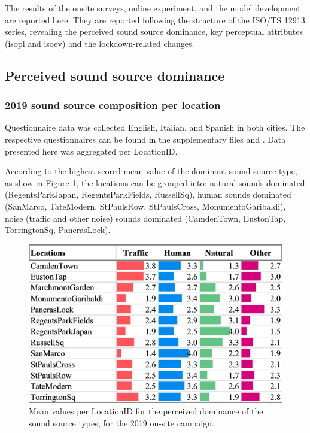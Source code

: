 The results of the onsite surveys, online experiment, and the model development are reported here. They are reported following the structure of the ISO/TS 12913 series, revealing the perceived sound source dominance, key perceptual attributes (\gls{isopl} and \gls{isoev}) and the lockdown-related changes.

 \subsection{Perceived sound source dominance}

   \subsubsection{2019 sound source composition per location}

   Questionnaire data was collected English, Italian, and Spanish in both cities. The respective questionnaires can be found in the supplementary files and \citet{Mitchell2020Soundscape}. Data presented here was aggregated per LocationID.

   According to the highest scored mean value of the dominant sound source type, as show in Figure \ref{fig:sound-source-dom}, the locations can be grouped into: natural sounds dominated (RegentsParkJapan, RegentsParkFields, RussellSq), human sounds dominated (SanMarco, TateModern, StPaulsRow, StPaulsCross, MonumentoGaribaldi), noise (traffic and other noise) sounds dominated (CamdenTown, EustonTap, TorringtonSq, PancrasLock).

   \begin{figure}
     \label{fig:sound-source-dom}
     \centering
     \includegraphics[width=.8\textwidth]{Figures/Lockdown-Fig2.jpg}
     \caption{Mean values per LocationID for the perceived dominance of the sound source types, for the 2019 on-site campaign.}
   \end{figure}

